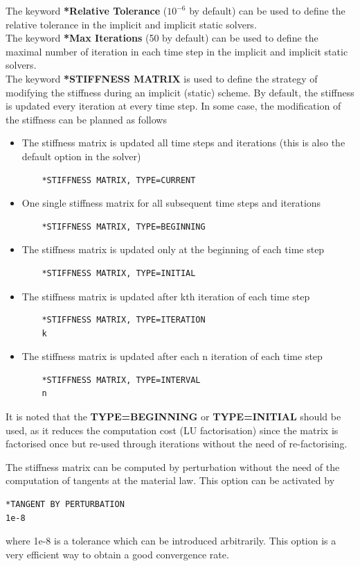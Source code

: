 \documentclass[oneside,11pt,times]{book}
\begin{document}
The keyword \textbf{*Relative Tolerance} ($10^{-6}$ by default) can be used to define the relative tolerance in the implicit and implicit static solvers.\\

The keyword \textbf{*Max Iterations} (50 by default) can be used to define the maximal number of iteration in each time step in the implicit and implicit static solvers.\\

The keyword \textbf{*STIFFNESS MATRIX} is used to define the strategy of modifying the stiffness during an implicit (static) scheme. By default, the stiffness is updated every iteration at every time step. In some case, the modification of the stiffness can be planned as follows
\begin{itemize}
	\item The stiffness matrix is updated all time steps and iterations (this is also the default option in the solver)
	\begin{lstlisting}
	*STIFFNESS MATRIX, TYPE=CURRENT
	\end{lstlisting}
	\item One single stiffness matrix for all subsequent time steps and iterations
	\begin{lstlisting}
	*STIFFNESS MATRIX, TYPE=BEGINNING
	\end{lstlisting}
	\item The stiffness matrix is updated only at the beginning of each time step
	\begin{lstlisting}
	*STIFFNESS MATRIX, TYPE=INITIAL
	\end{lstlisting}
	\item The stiffness matrix is updated after kth iteration of each time step
	\begin{lstlisting}
	*STIFFNESS MATRIX, TYPE=ITERATION
	k
	\end{lstlisting}
	\item The stiffness matrix is updated after each n iteration of each time step
	\begin{lstlisting}
	*STIFFNESS MATRIX, TYPE=INTERVAL
	n
	\end{lstlisting}
\end{itemize}
It is noted that the \textbf{TYPE=BEGINNING} or \textbf{TYPE=INITIAL} should be used, as it reduces the computation cost (LU factorisation) since the matrix is factorised once but re-used through iterations without the need of re-factorising.

The stiffness matrix can be computed by perturbation without the need of the computation of tangents at the material law. This option can be activated by
\begin{lstlisting}
*TANGENT BY PERTURBATION
1e-8
\end{lstlisting}
where 1e-8 is a tolerance which can be introduced arbitrarily. This option is a very efficient way to obtain a good convergence rate.
\end{document}
